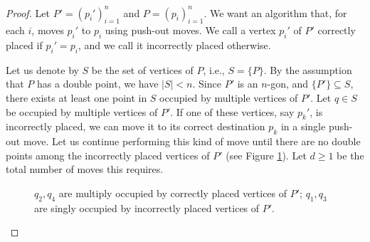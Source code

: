 \documentclass[11pt]{amsart}
\theoremstyle{remark}
\numberwithin{equation}{section}
\renewcommand{\geq}{\geqslant}
\begin{document}
\begin{proof}
Let $P'=(p_i')_{i=1}^n$ and $P=(p_i)_{i=1}^n$.
We want an algorithm that, for each $i$, moves $p_i'$ to $p_i$ using push-out moves. We call a vertex $p_i'$ of $P'$ correctly placed if  $p_i'=p_i$, and we call it incorrectly placed otherwise.

Let us denote by $S$ be the set of vertices of $P$, i.e., $S=\{P\}$. By the assumption that $P$ has a double point, we have $|S|<n$. Since $P'$ is an $n$-gon, 
and $\{P'\}\subseteq S$, there exists at least one point in  $S$ occupied by multiple vertices of $P'$. Let $q\in S$ be occupied by multiple vertices of $P'$. 
If one of these vertices, say $p_k'$, is incorrectly placed,  we can move it to its correct destination $p_k$ in a single push-out move. Let us continue performing this kind of move until there are no double points among the incorrectly placed vertices of $P'$ (see Figure \ref{fig_permutation}). Let $d\geq 1$ be the total number of moves this requires.


\begin{figure}[h]\label{fig_permutation}
\centering


\caption{$q_2,q_4$ are multiply occupied by correctly placed vertices of $P'$; $q_1,q_3$ are singly occupied by 
incorrectly placed vertices of $P'$.}
\label{fig_permutation}
\end{figure}




\end{proof}
\end{document}
